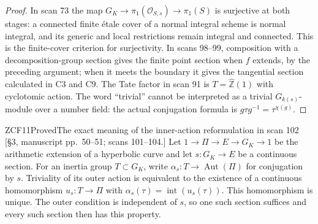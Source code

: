 \begin{proof}
In scan 73 the map $G_K\to\pi_1(\mathcal O_{S,s})\to\pi_1(S)$
is surjective at both stages: a connected finite \'etale cover
of a normal integral scheme is normal integral, and its generic
and local restrictions remain integral and connected. This is
the finite-cover criterion for surjectivity. In scans 98--99,
composition with a decomposition-group section gives the finite
point section when $f$ extends, by the preceding argument; when
it meets the boundary it gives the tangential section calculated
in C3 and C9. The Tate factor in scan 91 is $T=\widehat{\mathbb Z}(1)$
with cyclotomic action. The word ``trivial'' cannot be interpreted
as a trivial $G_{k(s)}$-module over a number field: the actual
conjugation formula is $g\tau g^{-1}=\tau^{\chi(g)}$.
\end{proof}

\begin{result}{ZCF11}{Proved}{The exact meaning of the inner-action reformulation in scan 102}
\textup{[\S3, manuscript pp.\ 50--51; scans 101--104.]}
Let $1\to\Pi\to E\to G_K\to1$ be the arithmetic extension
of a hyperbolic curve and let $s:G_K\to E$ be a continuous
section. For an inertia group $T\subset G_K$, write
$\alpha_s:T\to\operatorname{Aut}(\Pi)$ for conjugation by $s$.
Triviality of its outer action is equivalent to the existence
of a continuous homomorphism $u_s:T\to\Pi$ with
$\alpha_s(\tau)=\operatorname{int}(u_s(\tau))$.
This homomorphism is unique. The outer condition is independent
of $s$, so one such section suffices and every such section then
has this property.
\end{result}
